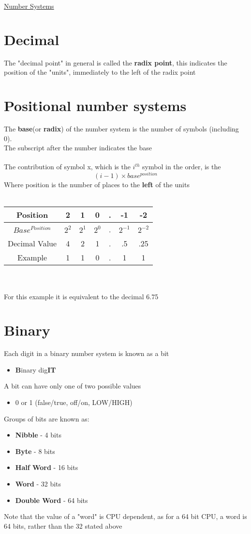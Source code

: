 \documentclass{article}[18pt]
\begin{document}
\begin{center}
\underline{\huge Number Systems}
\end{center}
\section{Decimal}
The "decimal point" in general is called the \textbf{radix point}, this indicates the position of the "units", immediately to the left of the radix point
\section{Positional number systems}
The \textbf{base}(or \textbf{radix}) of the number system is the number of symbols (including 0). \\
The subscript after the number indicates the base\\
\\
The contribution of symbol x, which is the $i^{th}$ symbol in the order, is the
$$(i-1)\times base^{position}$$
Where position is the number of places to the \textbf{left} of the units\\
\\
\begin{tabular}{|c|c|c|c|c|c|c|}
\hline
Position&2&1&0&.&-1&-2\\
\hline
$Base^{Position}$&$2^2$&$2^1$&$2^0$&.&$2^{-1}$&$2^{-2}$\\
\hline
Decimal Value&4&2&1&.&.5&.25\\
\hline
Example&1&1&0&.&1&1\\
\hline
\end{tabular}\\
\\
For this example it is equivalent to the decimal 6.75
\section{Binary}
Each digit in a binary number system is known as a bit
\begin{itemize}
\item \textbf{B}inary dig\textbf{IT}
\end{itemize}
A bit can have only one of two possible values
\begin{itemize}
\item 0 or 1 (false/true, off/on, LOW/HIGH)
\end{itemize}
Groups of bits are known as:
\begin{itemize}
\item \textbf{Nibble} - 4 bits
\item \textbf{Byte} - 8 bits
\item \textbf{Half Word} - 16 bits
\item \textbf{Word} - 32 bits
\item \textbf{Double Word} - 64 bits
\end{itemize}
Note that the value of a "word" is CPU dependent, as for a 64 bit CPU, a word is 64 bits, rather than the 32 stated above
\end{document}
